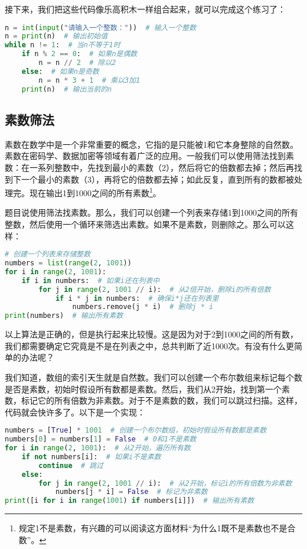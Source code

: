 \documentclass[../main.tex]{subfiles}
\begin{document}
接下来，我们把这些代码像乐高积木一样组合起来，就可以完成这个练习了：
\begin{lstlisting}[language=python]
n = int(input("请输入一个整数："))  # 输入一个整数
n = print(n)  # 输出初始值
while n != 1:  # 当n不等于1时
    if n % 2 == 0:  # 如果n是偶数
        n = n // 2  # 除以2
    else:  # 如果n是奇数
        n = n * 3 + 1  # 乘以3加1
    print(n)  # 输出当前的n
\end{lstlisting}

\subsection{素数筛法}
素数在数学中是一个非常重要的概念，它指的是只能被1和它本身整除的自然数。素数在密码学、数据加密等领域有着广泛的应用。一般我们可以使用筛法找到素数：在一系列整数中，先找到最小的素数（2），然后将它的倍数都去掉；然后再找到下一个最小的素数（3），再将它的倍数都去掉；如此反复，直到所有的数都被处理完。现在输出1到1000之间的所有素数\footnote{规定1不是素数，有兴趣的可以阅读这方面材料“为什么1既不是素数也不是合数”。}。

题目说使用筛法找素数。那么，我们可以创建一个列表来存储1到1000之间的所有整数，然后使用一个循环来筛选出素数。如果不是素数，则删除之。那么可以这样：

\begin{lstlisting}[language=python]
# 创建一个列表来存储整数
numbers = list(range(2, 1001))
for i in range(2, 1001):
    if i in numbers:  # 如果i还在列表中
        for j in range(2, 1001 // i):  # 从2倍开始，删除i的所有倍数
            if i * j in numbers:  # 确保i*j还在列表里
                numbers.remove(j * i)  # 删除j * i
print(numbers)  # 输出所有素数
\end{lstlisting}

以上算法是正确的，但是执行起来比较慢。这是因为对于2到1000之间的所有数，我们都需要确定它究竟是不是在列表之中，总共判断了近1000次。有没有什么更简单的办法呢？

我们知道，数组的索引天生就是自然数。我们可以创建一个布尔数组来标记每个数是否是素数，初始时假设所有数都是素数。然后，我们从2开始，找到第一个素数，标记它的所有倍数为非素数。对于不是素数的数，我们可以跳过扫描。这样，代码就会快许多了。以下是一个实现：

\begin{lstlisting}[language=python]
numbers = [True] * 1001  # 创建一个布尔数组，初始时假设所有数都是素数
numbers[0] = numbers[1] = False  # 0和1不是素数
for i in range(2, 1001):  # 从2开始，遍历所有数
    if not numbers[i]:  # 如果i不是素数
        continue  # 跳过
    else:
        for j in range(2, 1001 // i):  # 从2开始，标记i的所有倍数为非素数
            numbers[j * i] = False  # 标记为非素数
print([i for i in range(1001) if numbers[i]])  # 输出所有素数
\end{lstlisting}
\end{document}
